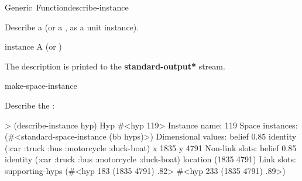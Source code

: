 \documentclass[10pt,twoside,english,pdftex]{article}
\begin{document}

\begin{functiondoc}{Generic~Function}{describe-instance}%
  {}
%
%
%

\fnsyntax

\fnpurpose Describe a  (or a
, as a unit instance).

\fnmethods
{}%
  {\code{(} }
\fnpackage {}

\fnmodule {}

\fnargs
\begin{args}{instance}
\arg[instance] A  (or )
\end{args}

\fndescription
{}%
The description is printed to the {\bf *standard-output*} stream.

\begin{alsos}{make-space-instance}
\end{alsos}

\fnexample
Describe the  :
\begin{example}
> (describe-instance hyp)
Hyp #<hyp 119>
  Instance name: 119
  Space instances: (#<standard-space-instance (bb hyps)>)
  Dimensional values:
    belief 0.85
    identity (:car :truck :bus :motorcycle :duck-boat)
    x 1835
    y 4791
  Non-link slots:
    belief 0.85
    identity (:car :truck :bus :motorcycle :duck-boat)
    location (1835 4791)
  Link slots:
    supporting-hyps (#<hyp 183 (1835 4791) .82>
                     #<hyp 233 (1835 4791) .89>)
\end{example}

\end{functiondoc}

\end{document}
